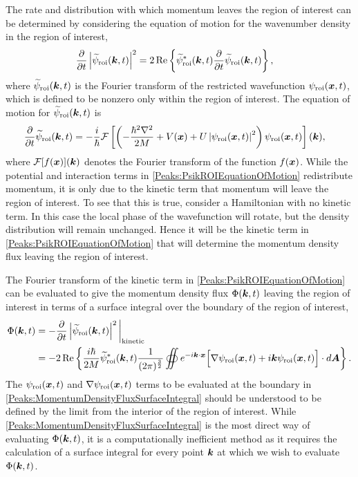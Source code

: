 The rate and distribution with which momentum leaves the region of interest can be determined by considering the equation of motion for the wavenumber density in the region of interest,
\begin{align}
    \frac{\partial }{\partial t}\left|\widetilde{\psi}_\text{roi}(\bm{k}, t)\right|^2 &= 2 \operatorname{Re} \left\{ \widetilde{\psi}_\text{roi}^*(\bm{k}, t) \frac{\partial }{\partial t}\widetilde{\psi}_\text{roi}(\bm{k}, t) \right \},
\end{align}
where $\widetilde{\psi}_\text{roi}(\bm{k}, t)$ is the Fourier transform of the restricted wavefunction $\psi_\text{roi}(\bm{x}, t)$, which is defined to be nonzero only within the region of interest. The equation of motion for $\widetilde{\psi}_\text{roi}(\bm{k}, t)$ is
\begin{align}
    \label{Peaks:PsikROIEquationOfMotion}
    \frac{\partial}{\partial t} \widetilde{\psi}_\text{roi}(\vect{k}, t) &= -\frac{i}{\hbar} \mathcal{F}\left[\left(-\frac{\hbar^2 \nabla^2}{2M} + V(\vect{x}) + U \abs{\psi_\text{roi}(\vect{x}, t)}^2\right) \psi_\text{roi}(\vect{x}, t)\right](\vect{k}),
\end{align}
where $\mathcal{F}[f(\bm{x})](\bm{k})$ denotes the Fourier transform of the function $f(\bm{x})$. While the potential and interaction terms in \eqref{Peaks:PsikROIEquationOfMotion} redistribute momentum, it is only due to the kinetic term that momentum will leave the region of interest. To see that this is true, consider a Hamiltonian with no kinetic term. In this case the local phase of the wavefunction will rotate, but the density distribution will remain unchanged. Hence it will be the kinetic term in \eqref{Peaks:PsikROIEquationOfMotion} that will determine the momentum density flux leaving the region of interest.

The Fourier transform of the kinetic term in \eqref{Peaks:PsikROIEquationOfMotion} can be evaluated to give the momentum density flux $\Phi(\bm{k}, t)$ leaving the region of interest in terms of a surface integral over the boundary of the region of interest,
\begin{align}
    \Phi(\vect{k}, t) & = -\frac{\partial }{\partial t}\abs{\widetilde{\psi}_\text{roi}(\vect{k}, t)}^2\bigg|_\text{kinetic}\\
    & = -2 \Re \left\{ \frac{i \hbar}{2 M} \widetilde{\psi}_\text{roi}^*(\vect{k}, t) \frac{1}{(2 \pi)^{\frac{3}{2}}}\oiint e^{-i \vect{k}\cdot \vect{x}} \Big[ \nabla \psi_\text{roi}(\vect{x}, t) + i \vect{k} \psi_\text{roi}(\vect{x}, t)\Big] \cdot d \vect{A} \right\}.
    \label{Peaks:MomentumDensityFluxSurfaceIntegral}
\end{align}
The $\psi_\text{roi}(\bm{x}, t)$ and $\nabla\psi_\text{roi}(\bm{x}, t)$ terms to be evaluated at the boundary in \eqref{Peaks:MomentumDensityFluxSurfaceIntegral} should be understood to be defined by the limit from the interior of the region of interest. While \eqref{Peaks:MomentumDensityFluxSurfaceIntegral} is the most direct way of evaluating $\Phi(\bm{k}, t)$, it is a computationally inefficient method as it requires the calculation of a surface integral for every point $\bm{k}$ at which we wish to evaluate $\Phi(\bm{k}, t)$. 

